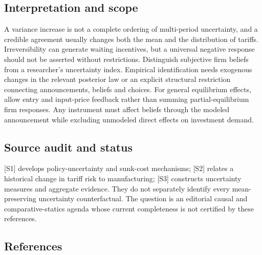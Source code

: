 \documentclass[11pt,a4paper]{article}
\begin{document}
\subsection*{Interpretation and scope}
A variance increase is not a complete ordering of multi-period uncertainty, and a credible agreement usually changes both the mean and the distribution of tariffs. Irreversibility can generate waiting incentives, but a universal negative response should not be asserted without restrictions. Distinguish subjective firm beliefs from a researcher’s uncertainty index. Empirical identification needs exogenous changes in the relevant posterior law or an explicit structural restriction connecting announcements, beliefs and choices. For general equilibrium effects, allow entry and input-price feedback rather than summing partial-equilibrium firm responses. Any instrument must affect beliefs through the modeled announcement while excluding unmodeled direct effects on investment demand.

\subsection*{Source audit and status}
[S1] develops policy-uncertainty and sunk-cost mechanisms; [S2] relates a historical change in tariff risk to manufacturing; [S3] constructs uncertainty measures and aggregate evidence. They do not separately identify every mean-preserving uncertainty counterfactual. The question is an editorial causal and comparative-statics agenda whose current completeness is not certified by these references.

\subsection*{References}
\end{document}
